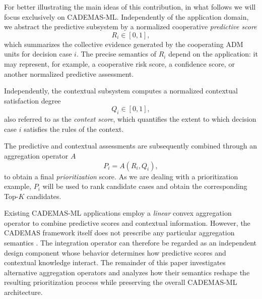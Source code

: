 \documentclass[mathematics,article,submit,moreauthors]{Definitions/mdpi}
\begin{document}
For better illustrating the main ideas of this contribution, in what follows we will focus exclusively on CADEMAS-ML. Independently of the application domain, we abstract the predictive subsystem by a normalized cooperative \emph{predictive score}
\begin{equation}
R_i \in [0,1],
\end{equation}
which summarizes the collective evidence generated by the cooperating ADM units for decision case $i$. The precise semantics of $R_i$ depend on the application: it may represent, for example, a cooperative risk score, a confidence score, or another normalized predictive assessment.

Independently, the contextual subsystem computes a normalized contextual satisfaction degree
\begin{equation}
Q_i \in [0,1],
\end{equation}
also referred to as the \emph{context score}, which quantifies the extent to which decision case $i$ satisfies the rules of the context.

The predictive and contextual assessments are subsequently combined through an aggregation operator $A$
\begin{equation}
P_i = A(R_i,Q_i),
\end{equation}
to obtain a final \textit{prioritization} score. As we are dealing with a prioritization example, $P_i$ will be used to rank candidate cases and obtain the corresponding Top-$K$ candidates.

Existing CADEMAS-ML applications employ a \textit{linear} convex aggregation operator to combine predictive scores and contextual information. However, the CADEMAS framework itself does not prescribe any particular aggregation semantics \citep{NovoaHernandez2026}. The integration operator can therefore be regarded as an independent design component whose behavior determines how predictive scores and contextual knowledge interact. The remainder of this paper investigates alternative aggregation operators and analyzes how their semantics reshape the resulting prioritization process while preserving the overall CADEMAS-ML architecture.
\end{document}
